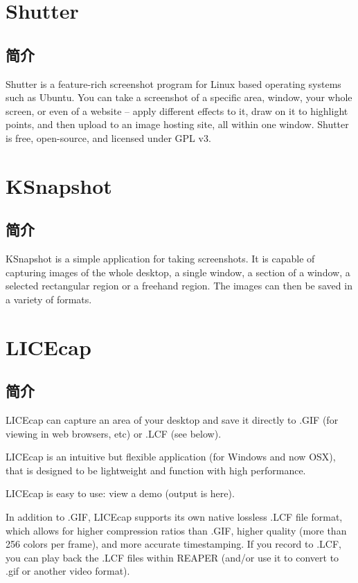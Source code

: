 \documentclass[paper=a4,fontsize=11pt]{article}
\begin{document}
	\section{Shutter}
	
	\subsection{简介}
	
	Shutter is a feature-rich screenshot program for Linux based operating systems such as Ubuntu. You can take a screenshot of a specific area, window, your whole screen, or even of a website – apply different effects to it, draw on it to highlight points, and then upload to an image hosting site, all within one window. Shutter is free, open-source, and licensed under GPL v3.		
	
	\section{KSnapshot}
	
	\subsection{简介}
	
	KSnapshot is a simple application for taking screenshots. It is capable of capturing images of the whole desktop, a single window, a section of a window, a selected rectangular region or a freehand region. The images can then be saved in a variety of formats.
	
	\section{LICEcap}
	
	\subsection{简介}
	
	LICEcap can capture an area of your desktop and save it directly to .GIF (for viewing in web browsers, etc) or .LCF (see below). 
	
	LICEcap is an intuitive but flexible application (for Windows and now OSX), that is designed to be lightweight and function with high performance. 
	
	LICEcap is easy to use: view a demo (output is here). 
	
	In addition to .GIF, LICEcap supports its own native lossless .LCF file format, which allows for higher compression ratios than .GIF, higher quality (more than 256 colors per frame), and more accurate timestamping. If you record to .LCF, you can play back the .LCF files within REAPER (and/or use it to convert to .gif or another video format). 
	
\end{document}
